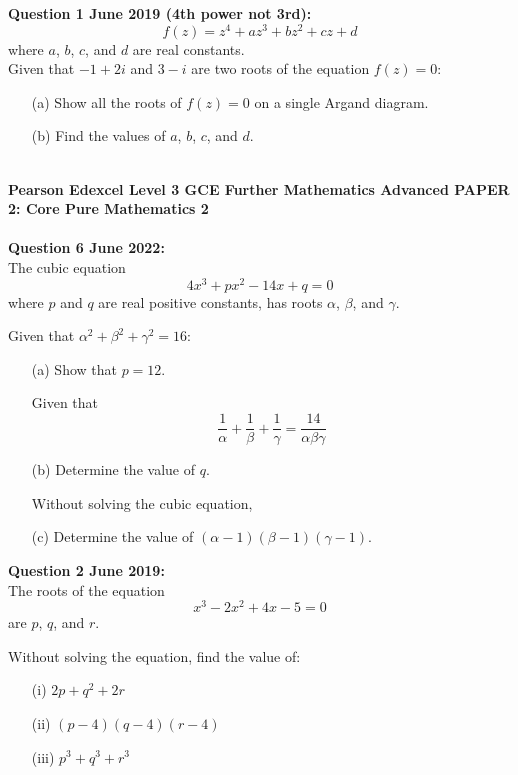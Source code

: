 \documentclass[12pt]{article}
\begin{document}
\textbf{Question 1 June 2019 (4th power not 3rd):}
\[f(z) = z^4 + az^3 + bz^2 + cz + d\] where \( a \), \( b \), \( c \), and \( d \) are real constants.\\
Given that \( -1 + 2i \) and \( 3 - i \) are two roots of the equation \( f(z) = 0 \):

\begin{enumerate}
    \item[(a)] Show all the roots of \( f(z) = 0 \) on a single Argand diagram.
    \item[(b)] Find the values of \( a \), \( b \), \( c \), and \( d \).\\\\
\end{enumerate}

\textbf{Pearson Edexcel Level 3 GCE Further Mathematics
Advanced PAPER 2: Core Pure Mathematics 2}\\\\

\textbf{Question 6 June 2022:}\\
The cubic equation
\[4x^3 + px^2 - 14x + q = 0\]
where \( p \) and \( q \) are real positive constants, has roots \( \alpha \), \( \beta \), and \( \gamma \).

Given that \( \alpha^2 + \beta^2 + \gamma^2 = 16 \):

\begin{enumerate}
    \item[(a)] Show that \( p = 12 \).
    
    Given that 
    \[\frac{1}{\alpha} + \frac{1}{\beta} + \frac{1}{\gamma} = \frac{14}{\alpha \beta \gamma}\]
    \item[(b)] Determine the value of \( q \).
    
    Without solving the cubic equation,
    \item[(c)] Determine the value of \( (\alpha - 1)(\beta - 1)(\gamma - 1) \).
\end{enumerate}

\textbf{Question 2 June 2019:}\\
The roots of the equation 
\[x^3 - 2x^2 + 4x - 5 = 0\]
are \( p \), \( q \), and \( r \).

Without solving the equation, find the value of:
\begin{enumerate}
    \item[(i)] \( 2p + q^2 + 2r \)
    \item[(ii)] \( (p - 4)(q - 4)(r - 4) \)
    \item[(iii)] \( p^3 + q^3 + r^3 \)
\end{enumerate}



\pagebreak 

\nocite{*}
\printbibliography{}
\end{document}
